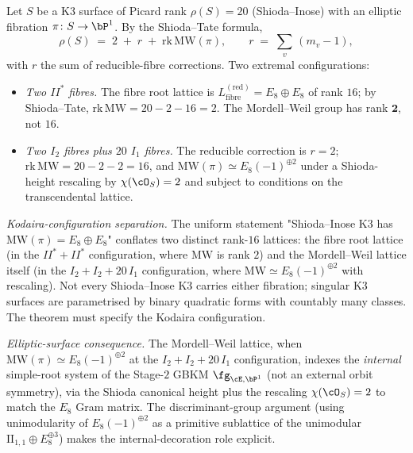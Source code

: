 \begin{theorem}
\label{wn:thm:second-pass-shioda-inose-MW}

Let $S$ be a K3 surface of Picard rank $\rho(S) = 20$ (Shioda--Inose)
with an elliptic fibration $\pi\colon S \to \bP^1$. By the
Shioda--Tate formula,
\[
\rho(S) \;=\; 2 \;+\; r \;+\; \mathrm{rk}\,\mathrm{MW}(\pi),
\qquad r \;=\; \sum_{v}\,(m_v - 1),
\]
with $r$ the sum of reducible-fibre corrections. Two extremal
configurations:
\begin{itemize}
\item \emph{Two $II^{\ast}$ fibres.} The fibre root lattice is
$L^{\mathrm{(red)}}_{\mathrm{fibre}} = E_8 \oplus E_8$ of rank $16$; by
Shioda--Tate, $\mathrm{rk}\,\mathrm{MW} = 20 - 2 - 16 = 2$. The
Mordell--Weil group has rank $\mathbf{2}$, not $16$.
\item \emph{Two $I_2$ fibres plus $20$ $I_1$ fibres.} The reducible
correction is $r = 2$; $\mathrm{rk}\,\mathrm{MW} = 20 - 2 - 2 = 16$,
and $\mathrm{MW}(\pi) \simeq E_8(-1)^{\oplus 2}$ under a Shioda-height
rescaling by $\chi(\cO_S) = 2$ and subject to conditions on the
transcendental lattice.
\end{itemize}

\emph{Kodaira-configuration separation.} The uniform statement
"Shioda--Inose K3 has $\mathrm{MW}(\pi) = E_8 \oplus E_8$" conflates
two distinct rank-$16$ lattices:
the fibre root lattice (in the $II^\ast + II^\ast$ configuration,
where $\mathrm{MW}$ is rank $2$) and the Mordell--Weil lattice itself
(in the $I_2 + I_2 + 20\,I_1$ configuration, where
$\mathrm{MW} \simeq E_8(-1)^{\oplus 2}$ with rescaling). Not every
Shioda--Inose K3 carries either fibration; singular K3 surfaces are
parametrised by binary quadratic forms with countably many classes.
The theorem must specify the Kodaira configuration.

\emph{Elliptic-surface consequence.} The
Mordell--Weil lattice, when $\mathrm{MW}(\pi) \simeq E_8(-1)^{\oplus
2}$ at the $I_2 + I_2 + 20\,I_1$ configuration, indexes the
\emph{internal} simple-root system of the Stage-$2$ GBKM
$\fg_{\cE, \bP^1}$ (not an external orbit symmetry), via the Shioda
canonical height plus the rescaling $\chi(\cO_S) = 2$ to match the
$E_8$ Gram matrix. The discriminant-group argument (using
unimodularity of $E_8(-1)^{\oplus 2}$ as a primitive sublattice of the
unimodular $\mathrm{II}_{1,1}\oplus E_8^{\oplus 3}$) makes the
internal-decoration role explicit.
\end{theorem}

